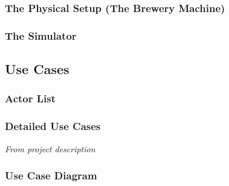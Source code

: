 \subsubsection{The Physical Setup (The Brewery Machine)}

\subsubsection{The Simulator}


\subsection{Use Cases}

\subsubsection{Actor List}

\subsubsection{Detailed Use Cases}
\textit{From project description}

\subsubsection{Use Case Diagram}
